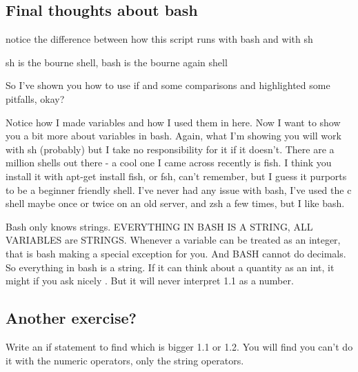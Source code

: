 \documentclass[10pt]{article}
\begin{document}
\subsection{Final thoughts about bash}
notice the difference between how this script runs with bash and with sh

sh is the bourne shell, bash is the bourne again shell

So I've shown you how to use if and some comparisons and highlighted some pitfalls, okay?

Notice how I made variables and how I used them in here. Now I want to show you a bit more about variables in bash. Again, what I'm showing you will work with sh (probably) but I take no responsibility for it if it doesn't. There are a million shells out there - a cool one I came across recently is fish. I think you install it with apt-get install fish, or fsh, can't remember, but I guess it purports to be a beginner friendly shell. I've never had any issue with bash, I've used the c shell maybe once or twice on an old server, and zsh a few times, but I like bash.

Bash only knows strings. EVERYTHING IN BASH IS A STRING, ALL VARIABLES are
STRINGS. Whenever a variable can be treated as an integer, that is bash making a
special exception for you. And BASH cannot do decimals. So everything in bash is
a string. If it can think about a quantity as an int, it might if you ask nicely
. But it will never interpret 1.1 as a number. 
\subsection{Another exercise?}
Write an if statement to find which is bigger 1.1 or 1.2. You will find you
can't do it with the numeric operators, only the string operators.
\end{document}
